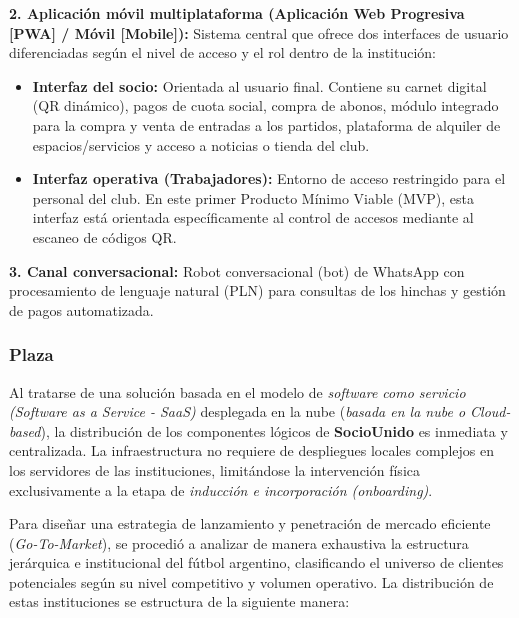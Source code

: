 \textbf{2. Aplicación móvil multiplataforma (Aplicación Web Progresiva [PWA] / Móvil [Mobile]):} Sistema central que ofrece dos interfaces de usuario diferenciadas según el nivel de acceso y el rol dentro de la institución:
\begin{itemize}
    \item \textbf{Interfaz del socio:} Orientada al usuario final. Contiene su carnet digital (QR dinámico), pagos de cuota social, compra de abonos, módulo integrado para la compra y venta de entradas a los partidos, plataforma de alquiler de espacios/servicios y acceso a noticias o tienda del club.
    \item \textbf{Interfaz operativa (Trabajadores):} Entorno de acceso restringido para el personal del club. En este primer Producto Mínimo Viable (MVP), esta interfaz está orientada específicamente al control de accesos mediante al escaneo de códigos QR.
\end{itemize}

\textbf{3. Canal conversacional:} Robot conversacional (bot) de WhatsApp con procesamiento de lenguaje natural (PLN) para consultas de los hinchas y gestión de pagos automatizada.

\newpage

\subsubsection*{Plaza}

Al tratarse de una solución basada en el modelo de \textit{software como servicio (Software as a Service - SaaS)} desplegada en la nube (\textit{basada en la nube o Cloud-based}), la distribución de los componentes lógicos de \textbf{SocioUnido} es inmediata y centralizada. La infraestructura no requiere de despliegues locales complejos en los servidores de las instituciones, limitándose la intervención física exclusivamente a la etapa de \textit{inducción e incorporación (onboarding)}.

Para diseñar una estrategia de lanzamiento y penetración de mercado eficiente (\textit{Go-To-Market}), se procedió a analizar de manera exhaustiva la estructura jerárquica e institucional del fútbol argentino, clasificando el universo de clientes potenciales según su nivel competitivo y volumen operativo. La distribución de estas instituciones se estructura de la siguiente manera:

